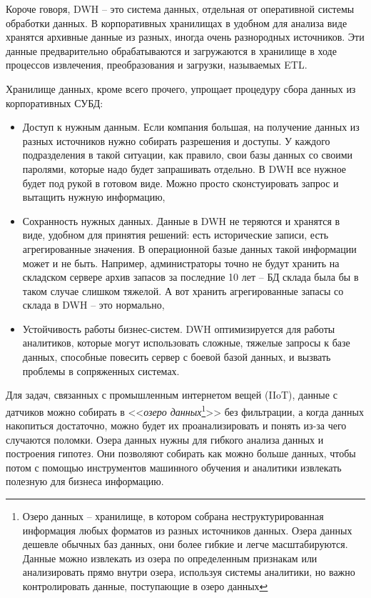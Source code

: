 \documentclass[%
	11pt,
	a4paper,
	utf8,
		]{article}
\begin{document}
Короче говоря, DWH -- это система данных, отдельная от оперативной системы обработки данных. В корпоративных хранилищах в удобном для анализа виде хранятся архивные данные из разных, иногда очень разнородных источников. Эти данные предварительно обрабатываются и загружаются в хранилище в ходе процессов извлечения, преобразования и загрузки, называемых ETL.

Хранилище данных, кроме всего прочего, упрощает процедуру сбора данных из корпоративных СУБД:
\begin{itemize}
	\item Доступ к нужным данным. Если компания большая, на получение данных из разных источников нужно собирать разрешения и доступы. У каждого подразделения в такой ситуации, как правило, свои базы данных со своими паролями, которые надо будет запрашивать отдельно. В DWH все нужное будет под рукой в готовом виде. Можно просто сконстуировать запрос и вытащить нужную информацию,
	
	\item Сохранность нужных данных. Данные в DWH не теряются и хранятся в виде, удобном для принятия решений: есть исторические записи, есть агрегированные значения. В операционной базые данных такой информации может и не быть. Например, администраторы точно не будут хранить на складском сервере архив запасов за последние 10 лет -- БД склада была бы в таком случае слишком тяжелой. А вот хранить агрегированные запасы со склада в DWH -- это нормально,
	
	\item Устойчивость работы бизнес-систем. DWH оптимизируется для работы аналитиков, которые могут использовать сложные, тяжелые запросы к базе данных, способные повесить сервер с боевой базой данных, и вызвать проблемы в сопряженных системах.
\end{itemize}


Для задач, связанных с промышленным интернетом вещей (IIoT), данные с датчиков можно собирать в <<\emph{озеро данных}\footnote{Озеро данных -- хранилище, в котором собрана неструктурированная информация любых форматов из разных источников данных. Озера данных дешевле обычных баз данных, они более гибкие и легче масштабируются. Данные можно извлекать из озера по определенным признакам или анализировать прямо внутри озера, используя системы аналитики, но важно контролировать данные, поступающие в озеро данных}>> без фильтрации, а когда данных накопиться достаточно, можно будет их проанализировать и понять из-за чего случаются поломки. Озера данных нужны для гибкого анализа данных и построения гипотез. Они позволяют собирать как можно больше данных, чтобы потом с помощью инструментов машинного обучения и аналитики извлекать полезную для бизнеса информацию.
\end{document}
